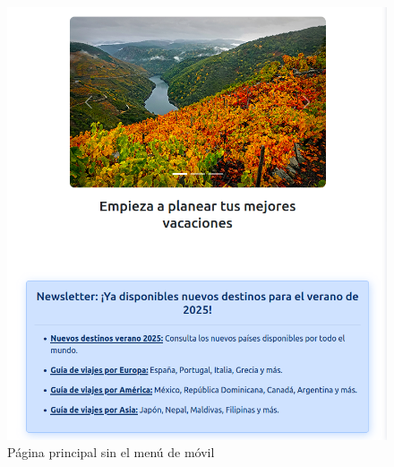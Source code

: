 \documentclass[11pt, a4paper]{book}
\begin{document}
	\begin{figure} [H]
		\centering
		\includegraphics[height=0.4\textheight]{CSS/1-5 768cut.png}
		\caption{Página principal sin el menú de móvil}
	\end{figure}
\end{document}
